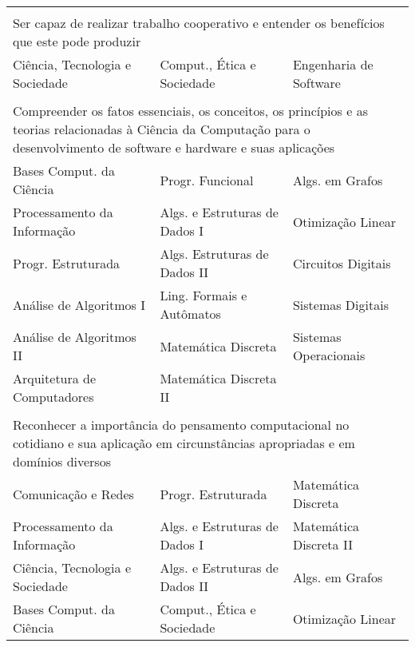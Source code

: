 \begin{longtable}{|p{}p{}p{}|}
    \multicolumn{3}{p{0.95\textwidth}}{}\\
    \multicolumn{3}{p{0.95\textwidth}}{Ser capaz de realizar trabalho cooperativo e entender os
    benefícios que este pode produzir}\\
    \hline
    \textcolor{nred}{Ciência, Tecnologia e Sociedade} &
    \textcolor{nblue}{Comput., Ética e Sociedade} &
    \textcolor{nblue}{Engenharia de Software}\\
    \hline
    
    \multicolumn{3}{p{0.95\textwidth}}{}\\
    \multicolumn{3}{p{0.95\textwidth}}{Compreender os fatos essenciais, os
    conceitos, os princípios e as teorias relacionadas à Ciência da Computação
    para o desenvolvimento de software e hardware e suas aplicações}\\
    \hline
    \textcolor{nred}{Bases Comput. da Ciência} &
    \textcolor{nblue}{Progr. Funcional} & 
    \textcolor{nblue}{Algs. em Grafos} \\
    \textcolor{nred}{Processamento da Informação} &
    \textcolor{nblue}{Algs. e Estruturas de Dados I} &
    \textcolor{nblue}{Otimização Linear}\\
    \textcolor{nblue}{Progr. Estruturada} & 
    \textcolor{nblue}{Algs. Estruturas de Dados II} &
    \textcolor{nblue}{Circuitos Digitais}\\
    \textcolor{nblue}{Análise de Algoritmos I} &
    \textcolor{nblue}{Ling. Formais e Autômatos} &
    \textcolor{nblue}{Sistemas Digitais}\\
    \textcolor{nblue}{Análise de Algoritmos II} &
    \textcolor{nblue}{Matemática Discreta} &
    \textcolor{nblue}{Sistemas Operacionais}\\
    \textcolor{nblue}{Arquitetura de Computadores} & 
    \textcolor{nblue}{Matemática Discreta II} & \\
    \hline
    
    \multicolumn{3}{p{0.95\textwidth}}{}\\
    \multicolumn{3}{p{0.95\textwidth}}{Reconhecer a importância do pensamento
    computacional no cotidiano e sua aplicação em circunstâncias apropriadas e
    em domínios diversos}\\
    \hline
    \textcolor{nred}{Comunicação e Redes} &
    \textcolor{nblue}{Progr. Estruturada} &
    \textcolor{nblue}{Matemática Discreta} \\
    \textcolor{nred}{Processamento da Informação} &
    \textcolor{nblue}{Algs. e Estruturas de Dados I}&
    \textcolor{nblue}{Matemática Discreta II}\\
    \textcolor{nred}{Ciência, Tecnologia e Sociedade} &
    \textcolor{nblue}{Algs. e Estruturas de Dados II}&
    \textcolor{nblue}{Algs. em Grafos}\\
    \textcolor{nred}{Bases Comput. da Ciência} &
    \textcolor{nblue}{Comput., Ética e Sociedade} &
    \textcolor{nblue}{Otimização Linear}\\
    \hline
    

\end{longtable}
